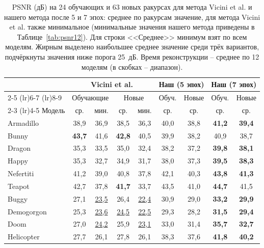 \begin{table}[ht]
    \centering
    \small
    \setlength{\tabcolsep}{3.5pt}
    \caption{PSNR (дБ) на 24 обучающих и 63 новых ракурсах для метода Vicini et al. и нашего метода после 5 и 7 эпох: среднее по ракурсам значение, для метода Vicini et al. также минимальное (минимальные значения нашего метода приведены в Таблице~\ref{tab:psnr12}). Для строки <<Среднее>> минимум взят по всем моделям. Жирным выделено наибольшее среднее значение среди трёх вариантов, подчёркнуты значения ниже порога 25~дБ. Время реконструкции -- среднее по 12 моделям (в скобках -- диапазон).}
    \label{tab:vicini}
    \begin{tabular}{lcccccccc}
        \toprule
        & \multicolumn{4}{c}{Vicini et al.} & \multicolumn{2}{c}{Наш (5 эпох)} & \multicolumn{2}{c}{Наш (7 эпох)} \\
        \cmidrule(lr){2-5} \cmidrule(lr){6-7} \cmidrule(lr){8-9}
        & \multicolumn{2}{c}{Обучающие} & \multicolumn{2}{c}{Новые} & Обуч. & Новые & Обуч. & Новые \\
        \cmidrule(lr){2-3} \cmidrule(lr){4-5}
        Модель & ср. & мин. & ср. & мин. & ср. & ср. & ср. & ср. \\
        \midrule
        Armadillo & 38,9 & 36,9 & 38,5 & 36,3 & 40,0 & 38,8 & \textbf{41,2} & \textbf{39,4} \\
        Bunny & \textbf{43,7} & 41,6 & \textbf{42,8} & 40,5 & 39,9 & 38,2 & 40,9 & 38,7 \\
        Dragon & 35,3 & 33,5 & 35,0 & 32,4 & 38,2 & 37,2 & \textbf{39,8} & \textbf{38,1} \\
        Happy & 35,3 & 32,7 & 34,9 & 31,7 & 38,0 & 37,3 & \textbf{39,5} & \textbf{38,3} \\
        Nefertiti & 41,2 & 39,0 & 40,8 & 37,8 & 42,1 & 40,3 & \textbf{43,8} & \textbf{41,3} \\
        Teapot & 42,7 & 37,8 & \textbf{41,7} & 33,7 & 43,5 & 41,0 & \textbf{44,7} & 41,5 \\
        Buggy & 27,1 & \underline{23,5} & 26,4 & \underline{22,4} & 30,9 & 29,0 & \textbf{33,2} & \textbf{29,9} \\
        Demogorgon & 25,3 & \underline{23,6} & \underline{24,5} & \underline{22,5} & 29,3 & 28,2 & \textbf{31,5} & \textbf{29,4} \\
        Doom & 27,0 & \underline{24,2} & 25,9 & \underline{23,1} & 33,0 & 31,4 & \textbf{35,7} & \textbf{32,7} \\
        Helicopter & 27,7 & 26,1 & 27,8 & 26,1 & 38,3 & 37,6 & \textbf{41,8} & \textbf{40,2} \\

\end{tabular}
\end{table}
